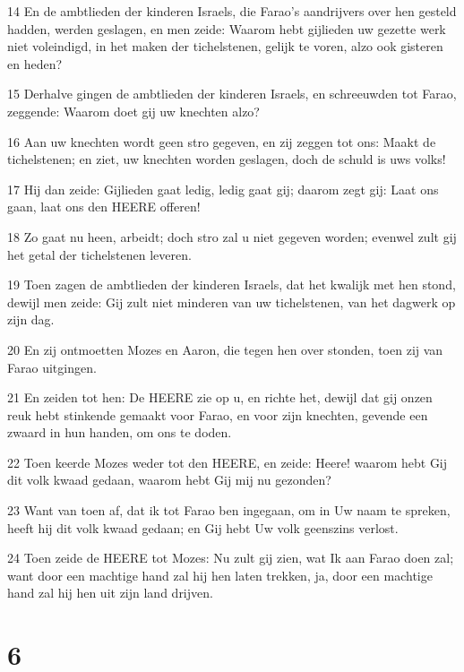 \par 14 En de ambtlieden der kinderen Israels, die Farao's aandrijvers over hen gesteld hadden, werden geslagen, en men zeide: Waarom hebt gijlieden uw gezette werk niet voleindigd, in het maken der tichelstenen, gelijk te voren, alzo ook gisteren en heden?
\par 15 Derhalve gingen de ambtlieden der kinderen Israels, en schreeuwden tot Farao, zeggende: Waarom doet gij uw knechten alzo?
\par 16 Aan uw knechten wordt geen stro gegeven, en zij zeggen tot ons: Maakt de tichelstenen; en ziet, uw knechten worden geslagen, doch de schuld is uws volks!
\par 17 Hij dan zeide: Gijlieden gaat ledig, ledig gaat gij; daarom zegt gij: Laat ons gaan, laat ons den HEERE offeren!
\par 18 Zo gaat nu heen, arbeidt; doch stro zal u niet gegeven worden; evenwel zult gij het getal der tichelstenen leveren.
\par 19 Toen zagen de ambtlieden der kinderen Israels, dat het kwalijk met hen stond, dewijl men zeide: Gij zult niet minderen van uw tichelstenen, van het dagwerk op zijn dag.
\par 20 En zij ontmoetten Mozes en Aaron, die tegen hen over stonden, toen zij van Farao uitgingen.
\par 21 En zeiden tot hen: De HEERE zie op u, en richte het, dewijl dat gij onzen reuk hebt stinkende gemaakt voor Farao, en voor zijn knechten, gevende een zwaard in hun handen, om ons te doden.
\par 22 Toen keerde Mozes weder tot den HEERE, en zeide: Heere! waarom hebt Gij dit volk kwaad gedaan, waarom hebt Gij mij nu gezonden?
\par 23 Want van toen af, dat ik tot Farao ben ingegaan, om in Uw naam te spreken, heeft hij dit volk kwaad gedaan; en Gij hebt Uw volk geenszins verlost.
\par 24 Toen zeide de HEERE tot Mozes: Nu zult gij zien, wat Ik aan Farao doen zal; want door een machtige hand zal hij hen laten trekken, ja, door een machtige hand zal hij hen uit zijn land drijven.

\chapter{6}

